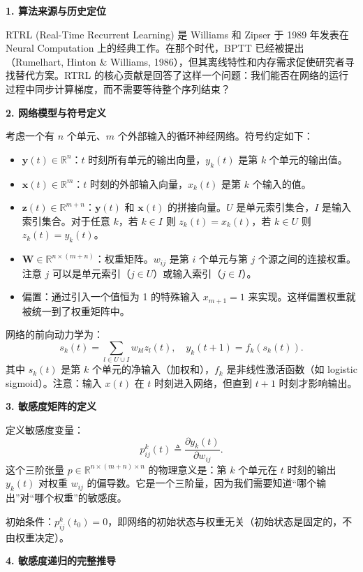 \documentclass[journal,12pt,onecolumn]{IEEEtran}
\begin{document}
\medskip\noindent\textbf{1. 算法来源与历史定位}

RTRL (Real-Time Recurrent Learning) 是 Williams 和 Zipser 于 1989 年发表在 Neural Computation 上的经典工作。在那个时代，BPTT 已经被提出（Rumelhart, Hinton \& Williams, 1986），但其离线特性和内存需求促使研究者寻找替代方案。RTRL 的核心贡献是回答了这样一个问题：我们能否在网络的运行过程中同步计算梯度，而不需要等待整个序列结束？

\medskip\noindent\textbf{2. 网络模型与符号定义}

考虑一个有 $n$ 个单元、$m$ 个外部输入的循环神经网络。符号约定如下：
\begin{itemize}
    \item $\mathbf{y}(t) \in \mathbb{R}^n$：$t$ 时刻所有单元的输出向量，$y_k(t)$ 是第 $k$ 个单元的输出值。
    \item $\mathbf{x}(t) \in \mathbb{R}^m$：$t$ 时刻的外部输入向量，$x_k(t)$ 是第 $k$ 个输入的值。
    \item $\mathbf{z}(t) \in \mathbb{R}^{m+n}$：$\mathbf{y}(t)$ 和 $\mathbf{x}(t)$ 的拼接向量。$U$ 是单元索引集合，$I$ 是输入索引集合。对于任意 $k$，若 $k \in I$ 则 $z_k(t) = x_k(t)$，若 $k \in U$ 则 $z_k(t) = y_k(t)$。
    \item $\mathbf{W} \in \mathbb{R}^{n \times (m+n)}$：权重矩阵。$w_{ij}$ 是第 $i$ 个单元与第 $j$ 个源之间的连接权重。注意 $j$ 可以是单元索引（$j \in U$）或输入索引（$j \in I$）。
    \item 偏置：通过引入一个值恒为 1 的特殊输入 $x_{m+1}=1$ 来实现。这样偏置权重就被统一到了权重矩阵中。
\end{itemize}

网络的前向动力学为：
\[
s_k(t) = \sum_{l \in U \cup I} w_{kl} z_l(t), \quad y_k(t+1) = f_k(s_k(t)). \tag{6}
\]
其中 $s_k(t)$ 是第 $k$ 个单元的净输入（加权和），$f_k$ 是非线性激活函数（如 logistic sigmoid）。注意：输入 $x(t)$ 在 $t$ 时刻进入网络，但直到 $t+1$ 时刻才影响输出。

\medskip\noindent\textbf{3. 敏感度矩阵的定义}

定义敏感度变量：
\[
p_{ij}^{k}(t) \triangleq \frac{\partial y_k(t)}{\partial w_{ij}}. \tag{7}
\]
这个三阶张量 $p \in \mathbb{R}^{n \times (m+n) \times n}$ 的物理意义是：第 $k$ 个单元在 $t$ 时刻的输出 $y_k(t)$ 对权重 $w_{ij}$ 的偏导数。它是一个三阶量，因为我们需要知道“哪个输出”对“哪个权重”的敏感度。

初始条件：$p_{ij}^{k}(t_0) = 0$，即网络的初始状态与权重无关（初始状态是固定的，不由权重决定）。

\medskip\noindent\textbf{4. 敏感度递归的完整推导}
\end{document}
